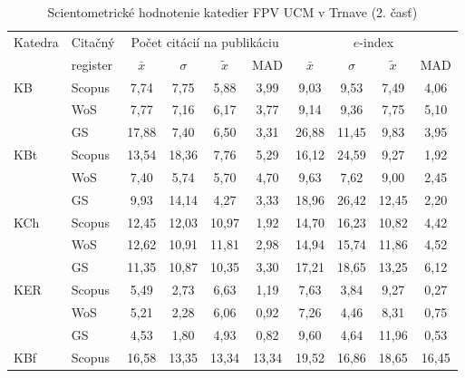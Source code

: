 \begin{table}
  \centering\small
  \caption[Hodnotenie FPV\,--\,počet citácií na publikáciu a $e$-index]{Scientometrické hodnotenie katedier FPV UCM v Trnave (2. časť)}
\label{tab:2-staff.results}
\begin{tabular}{llcccccccc}
\hline
  \toprule\noalign{\vspace{.3ex}}
  Katedra & Citačný  & \multicolumn{4}{c}{Počet citácií na publikáciu}   & \multicolumn{4}{c}{$e$-index}  \\
       & register & $\bar{x}$      & $\sigma$  & $\tilde{x}$ & MAD  & $\bar{x}$      & $\sigma$  & $\tilde{x}$  & MAD  \\[0.3ex]
  \midrule\noalign{\vspace{.5ex}}                                                                                                                         
 KB   & Scopus & 7,74        & 7,75  & 5,88  & 3,99  & 9,03    & 9,53  & 7,49  & 4,06  \\
      & WoS    & 7,77        & 7,16  & 6,17  & 3,77  & 9,14    & 9,36  & 7,75  & 5,10  \\
      & GS     & 17,88       & 7,40  & 6,50  & 3,31  & 26,88   & 11,45 & 9,83  & 3,95  \\[1ex]
 KBt  & Scopus & 13,54       & 18,36 & 7,76  & 5,29  & 16,12   & 24,59 & 9,27  & 1,92  \\
      & WoS    & 7,40        & 5,74  & 5,70  & 4,70  & 9,63    & 7,62  & 9,00  & 2,45  \\
      & GS     & 9,93        & 14,14 & 4,27  & 3,33  & 18,96   & 26,42 & 12,45 & 2,20  \\[1ex]
 KCh  & Scopus & 12,45       & 12,03 & 10,97 & 1,92  & 14,70   & 16,23 & 10,82 & 4,42  \\
      & WoS    & 12,62       & 10,91 & 11,81 & 2,98  & 14,94   & 15,74 & 11,86 & 4,52  \\
      & GS     & 11,35       & 10,87 & 10,35 & 3,30  & 17,21   & 18,65 & 13,25 & 6,12  \\[1ex]
 KER  & Scopus & 5,49        & 2,73  & 6,63  & 1,19  & 7,63    & 3,84  & 9,27  & 0,27  \\
      & WoS    & 5,21        & 2,28  & 6,06  & 0,92  & 7,26    & 4,46  & 8,31  & 0,75  \\
      & GS     & 4,53        & 1,80  & 4,93  & 0,82  & 9,60    & 4,64  & 11,96 & 0,53  \\[1ex]
 KBf  & Scopus & 16,58       & 13,35 & 13,34 & 13,34 & 19,52   & 16,86 & 18,65 & 16,45 \\

\end{tabular}
\end{table}
